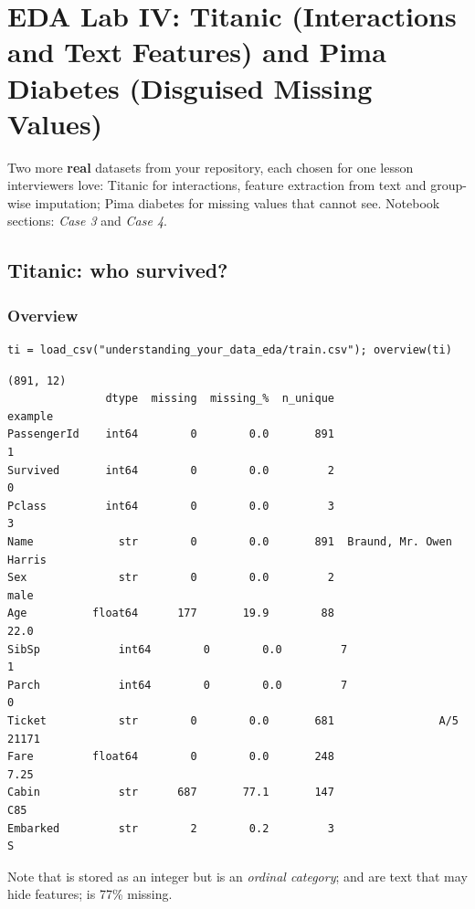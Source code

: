 \chapter{EDA Lab IV: Titanic (Interactions and Text Features) and Pima Diabetes (Disguised Missing Values)}

Two more \textbf{real} datasets from your repository, each chosen for one lesson interviewers love: Titanic for interactions, feature extraction from text
and group-wise imputation; Pima diabetes for missing values that  cannot see. Notebook sections: \emph{Case 3} and \emph{Case 4}.

\section{Titanic: who survived?}
\subsection{Overview}
\begin{lstlisting}
ti = load_csv("understanding_your_data_eda/train.csv"); overview(ti)
\end{lstlisting}
\outlabel
\begin{lstlisting}[style=out]
(891, 12)
               dtype  missing  missing_%  n_unique                  example
PassengerId    int64        0        0.0       891                        1
Survived       int64        0        0.0         2                        0
Pclass         int64        0        0.0         3                        3
Name             str        0        0.0       891  Braund, Mr. Owen Harris
Sex              str        0        0.0         2                     male
Age          float64      177       19.9        88                     22.0
SibSp            int64        0        0.0         7                        1
Parch            int64        0        0.0         7                        0
Ticket           str        0        0.0       681                A/5 21171
Fare         float64        0        0.0       248                     7.25
Cabin            str      687       77.1       147                      C85
Embarked         str        2        0.2         3                        S
\end{lstlisting}
Note that  is stored as an integer but is an \emph{ordinal category};  and  are text that may hide features;  is 77\% missing.

